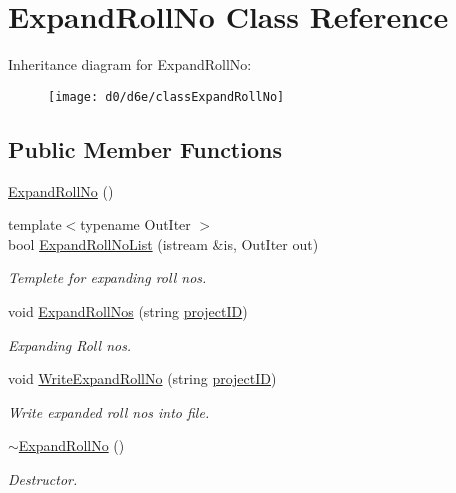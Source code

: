 \hypertarget{classExpandRollNo}{\section{\-Expand\-Roll\-No \-Class \-Reference}
\label{d0/d6e/classExpandRollNo}
}
\-Inheritance diagram for \-Expand\-Roll\-No\-:\begin{figure}[H]
\begin{center}
\leavevmode
\texttt{[image: d0/d6e/classExpandRollNo]}
\end{center}
\end{figure}
\subsection*{\-Public \-Member \-Functions}
\begin{DoxyCompactItemize}
\item 
\hyperlink{classExpandRollNo_a60e3a3d50ebe826b6d5c3304757812ca}{\-Expand\-Roll\-No} ()
\item 
{\footnotesize template$<$typename Out\-Iter $>$ }\\bool \hyperlink{classExpandRollNo_afcb476d9d9f1fdabd456f3ec84b14184}{\-Expand\-Roll\-No\-List} (istream \&is, \-Out\-Iter out)
\begin{DoxyCompactList}\small\item\em \-Templete for expanding roll nos. \end{DoxyCompactList}\item 
void \hyperlink{classExpandRollNo_a4917831a98da9aa068b2589945b46065}{\-Expand\-Roll\-Nos} (string \hyperlink{classReadInput_a3ad470a25b3e0a29466bf4ff1f7d8e81}{project\-I\-D})
\begin{DoxyCompactList}\small\item\em \-Expanding \-Roll nos. \end{DoxyCompactList}\item 
void \hyperlink{classExpandRollNo_af95bc4c35354c225bdfff5fae7f6b845}{\-Write\-Expand\-Roll\-No} (string \hyperlink{classReadInput_a3ad470a25b3e0a29466bf4ff1f7d8e81}{project\-I\-D})
\begin{DoxyCompactList}\small\item\em \-Write expanded roll nos into file. \end{DoxyCompactList}\item 
\hyperlink{classExpandRollNo_acf3cb7b789bd49a79672cb93dac2ed7c}{$\sim$\-Expand\-Roll\-No} ()
\begin{DoxyCompactList}\small\item\em \-Destructor. \end{DoxyCompactList}\end{DoxyCompactItemize}
